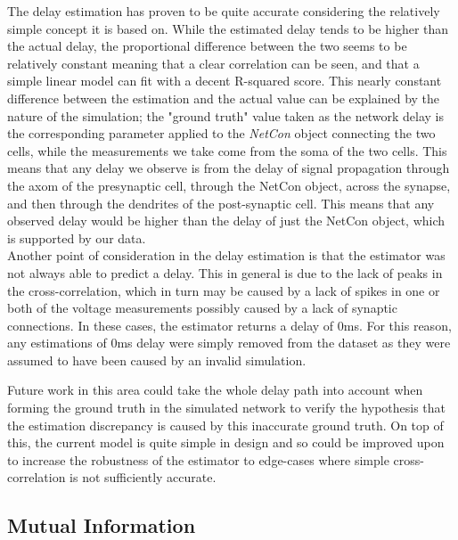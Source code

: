 The delay estimation has proven to be quite accurate considering the relatively simple concept it is based on. While the estimated delay tends to be higher than the actual delay, the proportional difference between the two seems to be relatively constant meaning that a clear correlation can be seen, and that a simple linear model can fit with a decent R-squared score. This nearly constant difference between the estimation and the actual value can be explained by the nature of the simulation; the "ground truth" value taken as the network delay is the corresponding parameter applied to the \emph{NetCon} object connecting the two cells, while the measurements we take come from the soma of the two cells. This means that any delay we observe is from the delay of signal propagation through the axom of the presynaptic cell, through the NetCon object, across the synapse, and then through the dendrites of the post-synaptic cell. This means that any observed delay would be higher than the delay of just the NetCon object, which is supported by our data.\\
Another point of consideration in the delay estimation is that the estimator was not always able to predict a delay. This in general is due to the lack of peaks in the cross-correlation, which in turn may be caused by a lack of spikes in one or both of the voltage measurements possibly caused by a lack of synaptic connections. In these cases, the estimator returns a delay of 0ms. For this reason, any estimations of 0ms delay were simply removed from the dataset as they were assumed to have been caused by an invalid simulation.
\par
Future work in this area could take the whole delay path into account when forming the ground truth in the simulated network to verify the hypothesis that the estimation discrepancy is caused by this inaccurate ground truth. On top of this, the current model is quite simple in design and so could be improved upon to increase the robustness of the estimator to edge-cases where simple cross-correlation is not sufficiently accurate.

\subsection{Mutual Information}

